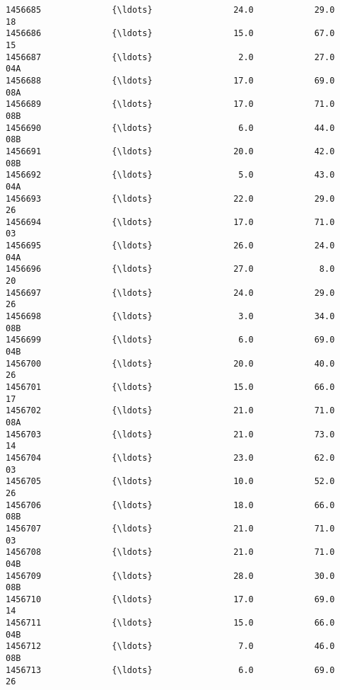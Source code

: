\documentclass[11pt]{article}
\begin{document}
\begin{Verbatim}[commandchars=\\\{\}]
1456685              {\ldots}                24.0            29.0        18   
1456686              {\ldots}                15.0            67.0        15   
1456687              {\ldots}                 2.0            27.0       04A   
1456688              {\ldots}                17.0            69.0       08A   
1456689              {\ldots}                17.0            71.0       08B   
1456690              {\ldots}                 6.0            44.0       08B   
1456691              {\ldots}                20.0            42.0       08B   
1456692              {\ldots}                 5.0            43.0       04A   
1456693              {\ldots}                22.0            29.0        26   
1456694              {\ldots}                17.0            71.0        03   
1456695              {\ldots}                26.0            24.0       04A   
1456696              {\ldots}                27.0             8.0        20   
1456697              {\ldots}                24.0            29.0        26   
1456698              {\ldots}                 3.0            34.0       08B   
1456699              {\ldots}                 6.0            69.0       04B   
1456700              {\ldots}                20.0            40.0        26   
1456701              {\ldots}                15.0            66.0        17   
1456702              {\ldots}                21.0            71.0       08A   
1456703              {\ldots}                21.0            73.0        14   
1456704              {\ldots}                23.0            62.0        03   
1456705              {\ldots}                10.0            52.0        26   
1456706              {\ldots}                18.0            66.0       08B   
1456707              {\ldots}                21.0            71.0        03   
1456708              {\ldots}                21.0            71.0       04B   
1456709              {\ldots}                28.0            30.0       08B   
1456710              {\ldots}                17.0            69.0        14   
1456711              {\ldots}                15.0            66.0       04B   
1456712              {\ldots}                 7.0            46.0       08B   
1456713              {\ldots}                 6.0            69.0        26   


\end{Verbatim}
\end{document}
